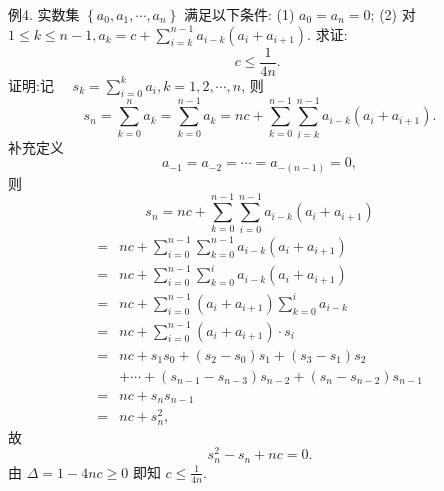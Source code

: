 例4. 实数集 $\left\{a_0, a_1, \cdots, a_n\right\}$ 满足以下条件:
(1) $a_0=a_n=0$;
(2) 对 $1 \leqslant k \leqslant n-1, a_k=c+\sum_{i=k}^{n-1} a_{i-k}\left(a_i+a_{i+1}\right)$.
求证:
$$
c \leqslant \frac{1}{4 n} \text {. }
$$
证明:记 $\quad s_k=\sum_{i=0}^k a_i, k=1,2, \cdots, n$,
则
$$
s_n=\sum_{k=0}^n a_k=\sum_{k=0}^{n-1} a_k=n c+\sum_{k=0}^{n-1} \sum_{i=k}^{n-1} a_{i-k}\left(a_i+a_{i+1}\right) .
$$
补充定义
$$
a_{-1}=a_{-2}=\cdots=a_{-(n-1)}=0,
$$
则
$$
s_n=n c+\sum_{k=0}^{n-1} \sum_{i=0}^{n-1} a_{i-k}\left(a_i+a_{i+1}\right)
$$
$$
\begin{aligned}
= & n c+\sum_{i=0}^{n-1} \sum_{k=0}^{n-1} a_{i-k}\left(a_i+a_{i+1}\right) \\
= & n c+\sum_{i=0}^{n-1} \sum_{k=0}^i a_{i-k}\left(a_i+a_{i+1}\right) \\
= & n c+\sum_{i=0}^{n-1}\left(a_i+a_{i+1}\right) \sum_{k=0}^i a_{i-k} \\
= & n c+\sum_{i=0}^{n-1}\left(a_i+a_{i+1}\right) \cdot s_i \\
= & n c+s_1 s_0+\left(s_2-s_0\right) s_1+\left(s_3-s_1\right) s_2 \\
& +\cdots+\left(s_{n-1}-s_{n-3}\right) s_{n-2}+\left(s_n-s_{n-2}\right) s_{n-1} \\
= & n c+s_n s_{n-1} \\
= & n c+s_n^2,
\end{aligned}
$$
故
$$
s_n^2-s_n+n c=0 .
$$
由 $\Delta=1-4 n c \geqslant 0$ 即知 $c \leqslant \frac{1}{4 n}$.



